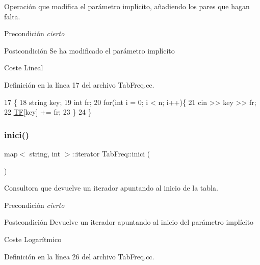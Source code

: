 Operación que modifica el parámetro implícito, añadiendo los pares que hagan falta. 

\begin{DoxyPrecond}{Precondición}
{\itshape cierto} 
\end{DoxyPrecond}
\begin{DoxyPostcond}{Postcondición}
Se ha modificado el parámetro implícito 
\end{DoxyPostcond}
\begin{DoxyParagraph}{Coste}
Lineal 
\end{DoxyParagraph}


Definición en la línea 17 del archivo Tab\+Freq.\+cc.


\begin{DoxyCode}
17                            \{
18   \textcolor{keywordtype}{string} key;
19   \textcolor{keywordtype}{int} fr;
20   \textcolor{keywordflow}{for}(\textcolor{keywordtype}{int} i = 0; i < n; i++)\{
21     cin >> key >> fr;
22     \hyperlink{class_tab_freq_ae6be9a9671af1d897960648e10a62cfb}{TF}[key] += fr;
23   \}
24 \}
\end{DoxyCode}
\mbox{\label{class_tab_freq_a4c139f7774cf70aa67d354f7f4d3ae87}} 
\subsubsection{\texorpdfstring{inici()}{inici()}}
{\footnotesize\ttfamily map$<$ string, int $>$\+::iterator Tab\+Freq\+::inici (\begin{DoxyParamCaption}{ }\end{DoxyParamCaption})}



Consultora que devuelve un iterador apuntando al inicio de la tabla. 

\begin{DoxyPrecond}{Precondición}
{\itshape cierto} 
\end{DoxyPrecond}
\begin{DoxyPostcond}{Postcondición}
Devuelve un iterador apuntando al inicio del parámetro implícito 
\end{DoxyPostcond}
\begin{DoxyParagraph}{Coste}
Logarítmico 
\end{DoxyParagraph}


Definición en la línea 26 del archivo Tab\+Freq.\+cc.


